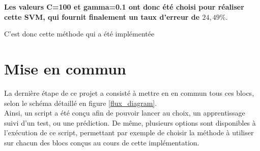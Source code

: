 \textbf{Les valeurs C=100 et gamma=0.1 ont donc été choisi pour réaliser cette SVM, qui fournit finalement un taux d'erreur de $24,49\%$}.

C'est donc cette méthode qui a été implémentée

 
\section{Mise en commun} 
\par La dernière étape de ce projet a consisté à mettre en en commun tous ces blocs, selon le schéma détaillé en figure \ref{flux_diagram}.\\ 
Ainsi, un script a été conçu afin de pouvoir lancer au choix, un apprentissage suivi d'un test, ou une prédiction. De même, plusieurs options sont disponibles à l'exécution de ce script, permettant par exemple de choisir la méthode à utiliser sur chacun des blocs conçus au cours de cette implémentation. 





